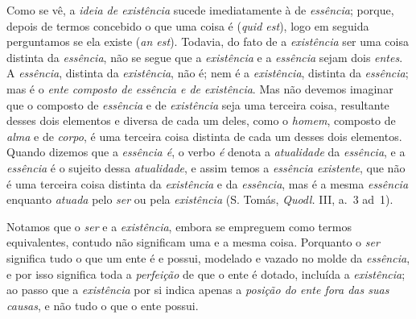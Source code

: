 \documentclass[12pt,a4paper]{article}
\begin{document}
{  Como se vê, a \emph{ideia de existência} sucede imediatamente à de
  \emph{essência}; porque, depois de termos concebido o que uma coisa é
  (\emph{quid est}), logo em seguida perguntamos se ela existe (\emph{an est}).
  \textemdash{} Todavia, do fato de a \emph{existência} ser uma coisa distinta
  da \emph{essência}, não se segue que a \emph{existência} e a \emph{essência}
  sejam dois \emph{entes}. A \emph{essência}, distinta da \emph{existência}, não
  é; nem é a \emph{existência}, distinta da \emph{essência}; mas é o \emph{ente
  composto de essência e de existência}. \textemdash{} Mas não devemos imaginar
  que o composto de \emph{essência} e de \emph{existência} seja uma terceira
  coisa, resultante desses dois elementos e diversa de cada um deles, como o
  \emph{homem}, composto de \emph{alma} e de \emph{corpo}, é uma terceira coisa
  distinta de cada um desses dois elementos. Quando dizemos que a \emph{essência
  é}, o verbo \emph{é} denota a \emph{atualidade} da \emph{essência}, e a
  \emph{essência} é o sujeito dessa \emph{atualidade}, e assim temos a
  \emph{essência existente}, que não é uma terceira coisa distinta da
  \emph{existência} e da \emph{essência}, mas é a mesma \emph{essência} enquanto
  \emph{atuada} pelo \emph{ser} ou pela \emph{existência} (S. Tomás,
  \emph{Quodl.} III, a.~3 ad~1).

  Notamos que o \emph{ser} e a \emph{existência}, embora se empreguem como
  termos equivalentes, contudo não significam uma e a mesma coisa. Porquanto o
  \emph{ser} significa tudo o que um ente é e possui, modelado e vazado no
  molde da \emph{essência}, e por isso significa toda a \emph{perfeição} de que
  o ente é dotado, incluída a \emph{existência}; ao passo que a \emph{existência}
  por si indica apenas a \emph{posição do ente fora das suas causas}, e não tudo
  o que o ente possui.}
\end{document}
